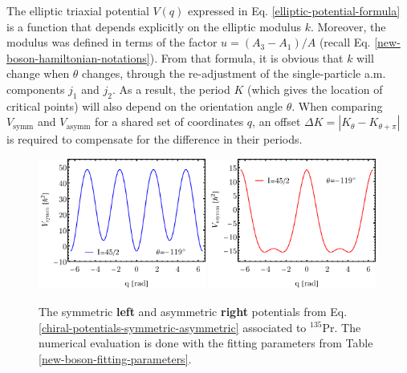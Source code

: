 The elliptic triaxial potential $V(q)$ expressed in Eq. \ref{elliptic-potential-formula} is a function that depends explicitly on the elliptic modulus $k$. Moreover, the modulus was defined in terms of the factor $u=(A_3-A_1)/A$ (recall Eq. \ref{new-boson-hamiltonian-notations}). From that formula, it is obvious that $k$ will change when $\theta$ changes, through the re-adjustment of the single-particle a.m. components $j_1$ and $j_2$. As a result, the period $K$ (which gives the location of critical points) will also depend on the orientation angle $\theta$. When comparing $V_\text{symm}$ and $V_\text{asymm}$ for a shared set of coordinates $q$, an offset $\Delta K=\left|K_\theta-K_{\theta+\pi}\right|$ is required to compensate for the difference in their periods.
\begin{figure}
    \centering
    \includegraphics[width=0.49\textwidth]{Chapters/Figures/symmetric-potential-135Pr.pdf}
    \includegraphics[width=0.49\textwidth]{Chapters/Figures/asymmetric-potential-135Pr.pdf}
    \caption{The symmetric \textbf{left} and asymmetric \textbf{right} potentials from Eq. \ref{chiral-potentials-symmetric-asymmetric} associated to $^{135}$Pr. The numerical evaluation is done with the fitting parameters from Table \ref{new-boson-fitting-parameters}.}
    \label{chiral-potentials-plot}
\end{figure}

